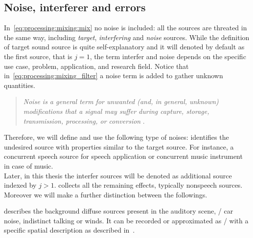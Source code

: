\subsection{Noise, interferer and errors}
In~\cref{eq:processing:mixing:mix} no noise is included:
all the sources are threated in the same way, including \textit{target}, \textit{interfering} and \textit{noise} sources.
While the definition of target sound source is quite self-explanatory and it will denoted by default as the first source, that is $j = 1$,
the term interfer and noise depends on the specific use case, problem, application, and research field.
Notice that in~\cref{eq:processing:mixing_filter} a noise term is added to gather unknown quantities.
\begin{quote}
    \textit{Noise is a general term for unwanted (and, in general, unknown) modifications that a signal may suffer during capture, storage, transmission, processing, or conversion}
    .
\end{quote}
Therefore, we will define and use the following type of noises:
 identifies the undesired source with properties similar to the target source.
For instance, a concurrent speech source for speech application or concurrent music instrument in case of music.
\\Later, in this thesis the interfer sources will be denoted as additional source indexed by $j > 1$.
 collects all the remaining effects, typically nonspeech sources. Moreover we will make a further distinction between the followings.

 describes the background diffuse sources present in the auditory scene, \eg/ car noise, indistinct talking or winds.
It can be recorded or approximated as \AWGN/ with a specific spatial description as described in~.

